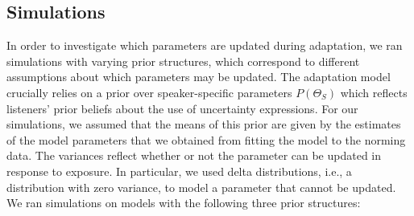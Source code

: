 \documentclass[man, floatsintext]{apa6}
\begin{document}
\subsection{Simulations}

In order to investigate which parameters are updated during adaptation, we ran simulations
with varying prior structures, which correspond to different assumptions about which parameters may be updated.
The adaptation model crucially relies on a prior over speaker-specific parameters $P(\Theta_S)$
which reflects listeners' prior beliefs about the use of uncertainty expressions. For our simulations,
we assumed that the means of this prior are given by the estimates of the model parameters that 
we obtained from fitting the model to the norming data. The variances reflect whether or not the parameter can be updated in response to exposure. In particular, we used delta distributions, i.e., a distribution with zero variance, to model a parameter that cannot be updated. We ran simulations on models with the following three prior structures:
\end{document}
